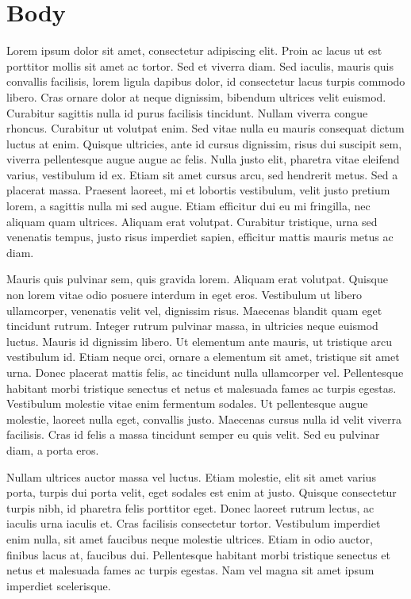 \chapter{Body}\label{chap:body}

Lorem ipsum dolor sit amet, consectetur adipiscing elit. Proin ac lacus ut est
porttitor mollis sit amet ac tortor. Sed et viverra diam. Sed iaculis, mauris
quis convallis facilisis, lorem ligula dapibus dolor, id consectetur lacus
turpis commodo libero. Cras ornare dolor at neque dignissim, bibendum ultrices
velit euismod. Curabitur sagittis nulla id purus facilisis tincidunt. Nullam
viverra congue rhoncus. Curabitur ut volutpat enim. Sed vitae nulla eu mauris
consequat dictum luctus at enim. Quisque ultricies, ante id cursus dignissim,
risus dui suscipit sem, viverra pellentesque augue augue ac felis. Nulla justo
elit, pharetra vitae eleifend varius, vestibulum id ex. Etiam sit amet cursus
arcu, sed hendrerit metus. Sed a placerat massa. Praesent laoreet, mi et
lobortis vestibulum, velit justo pretium lorem, a sagittis nulla mi sed augue.
Etiam efficitur dui eu mi fringilla, nec aliquam quam ultrices. Aliquam erat
volutpat. Curabitur tristique, urna sed venenatis tempus, justo risus imperdiet
sapien, efficitur mattis mauris metus ac diam.

Mauris quis pulvinar sem, quis gravida lorem. Aliquam erat volutpat. Quisque non
lorem vitae odio posuere interdum in eget eros. Vestibulum ut libero
ullamcorper, venenatis velit vel, dignissim risus. Maecenas blandit quam eget
tincidunt rutrum. Integer rutrum pulvinar massa, in ultricies neque euismod
luctus. Mauris id dignissim libero. Ut elementum ante mauris, ut tristique arcu
vestibulum id. Etiam neque orci, ornare a elementum sit amet, tristique sit amet
urna. Donec placerat mattis felis, ac tincidunt nulla ullamcorper vel.
Pellentesque habitant morbi tristique senectus et netus et malesuada fames ac
turpis egestas. Vestibulum molestie vitae enim fermentum sodales. Ut
pellentesque augue molestie, laoreet nulla eget, convallis justo. Maecenas
cursus nulla id velit viverra facilisis. Cras id felis a massa tincidunt semper
eu quis velit. Sed eu pulvinar diam, a porta eros.

Nullam ultrices auctor massa vel luctus. Etiam molestie, elit sit amet varius
porta, turpis dui porta velit, eget sodales est enim at justo. Quisque
consectetur turpis nibh, id pharetra felis porttitor eget. Donec laoreet rutrum
lectus, ac iaculis urna iaculis et. Cras facilisis consectetur tortor.
Vestibulum imperdiet enim nulla, sit amet faucibus neque molestie ultrices.
Etiam in odio auctor, finibus lacus at, faucibus dui. Pellentesque habitant
morbi tristique senectus et netus et malesuada fames ac turpis egestas. Nam vel
magna sit amet ipsum imperdiet scelerisque.

